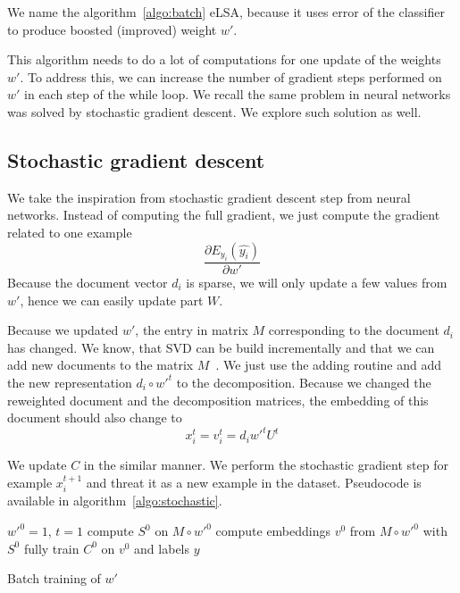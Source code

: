     We name the algorithm~\ref{algo:batch} eLSA, because it uses error of the classifier to produce boosted (improved) weight $w'$.
    
    This algorithm needs to do a lot of computations for one update of the weights $w'$.
    To address this, we can increase the number of gradient steps performed on $w'$ in each step of the while loop.
    We recall the same problem in neural networks was solved by stochastic gradient descent.
    We explore such solution as well.
    
    \subsection{Stochastic gradient descent}
    
    We take the inspiration from stochastic gradient descent step from neural networks.
    Instead of computing the full gradient, we just compute the gradient related to one example 
    $$\frac{\partial E_{y_i}(\hat{y_i})}{\partial w'}$$
    Because the document vector $d_i$ is sparse, we will only update a few values from $w'$, hence we can easily update part $W$.
    
    Because we updated $w'$, the entry in matrix $M$ corresponding to the document $d_i$ has changed.
    We know, that SVD can be build incrementally and that we can add new documents to the matrix $M$~\cite{brand2006fast}.
    We just use the adding routine and add the new representation $d_i \circ w'^{t}$ to the decomposition.
    Because we changed the reweighted document and the decomposition matrices,
    the embedding of this document should also change to 
    \begin{equation}
    x_i^{t} = v_i^{t} = d_i w'^{t} U^{t}
    \end{equation}
    
    We update $C$ in the similar manner.
    We perform the stochastic gradient step for example $x_i^{t+1}$ and threat it as a new example in the dataset.
    Pseudocode is available in algorithm~\ref{algo:stochastic}.
    
    \begin{algorithm}[H]
        $w'^0 = 1$, $t=1$\;
        compute $S^0$ on $M \circ w'^{0}$\;
        compute embeddings $v^0$ from $M \circ w'^{0}$ with $S^0$\;
        fully train $C^0$ on $v^0$ and labels $y$\;
        
        \caption{Batch training of $w'$} \label{algo:stochastic}
    \end{algorithm}
    
